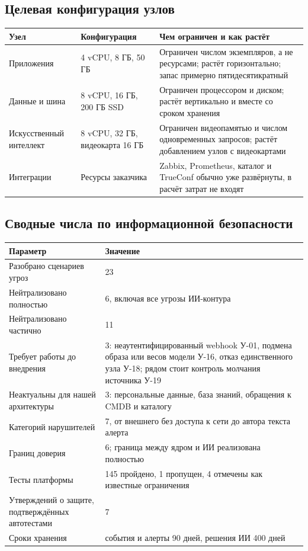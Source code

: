 \documentclass[11pt]{article}
\begin{document}
\subsection{Целевая конфигурация узлов}
\begin{longtable}{|L{3.2cm}|L{5.4cm}|L{7.4cm}|}
\hline
\textbf{Узел} & \textbf{Конфигурация} & \textbf{Чем ограничен и как растёт} \\ \hline
Приложения & 4 vCPU, 8 ГБ, 50 ГБ & Ограничен числом экземпляров, а не ресурсами; растёт горизонтально; запас примерно пятидесятикратный \\ \hline
Данные и шина & 8 vCPU, 16 ГБ, 200 ГБ SSD & Ограничен процессором и диском; растёт вертикально и вместе со сроком хранения \\ \hline
Искусственный интеллект & 8 vCPU, 32 ГБ, видеокарта 16 ГБ & Ограничен видеопамятью и числом одновременных запросов; растёт добавлением узлов с видеокартами \\ \hline
Интеграции & Ресурсы заказчика & Zabbix, Prometheus, каталог и TrueConf обычно уже развёрнуты, в расчёт затрат не входят \\ \hline
\end{longtable}

\subsection{Сводные числа по информационной безопасности}
\begin{longtable}{|L{7cm}|L{9.5cm}|}
\hline
\textbf{Параметр} & \textbf{Значение} \\ \hline
Разобрано сценариев угроз & 23 \\ \hline
Нейтрализовано полностью & 6, включая все угрозы ИИ-контура \\ \hline
Нейтрализовано частично & 11 \\ \hline
Требует работы до внедрения & 3: неаутентифицированный webhook У-01, подмена образа или весов модели У-16, отказ единственного узла У-18; рядом стоит контроль молчания источника У-19 \\ \hline
Неактуальны для нашей архитектуры & 3: персональные данные, база знаний, обращения к CMDB и каталогу \\ \hline
Категорий нарушителей & 7, от внешнего без доступа к сети до автора текста алерта \\ \hline
Границ доверия & 6; граница между ядром и ИИ реализована полностью \\ \hline
Тесты платформы & 145 пройдено, 1 пропущен, 4 отмечены как известные ограничения \\ \hline
Утверждений о защите, подтверждённых автотестами & 7 \\ \hline
Сроки хранения & события и алерты 90 дней, решения ИИ 400 дней \\ \hline
\end{longtable}
\end{document}
